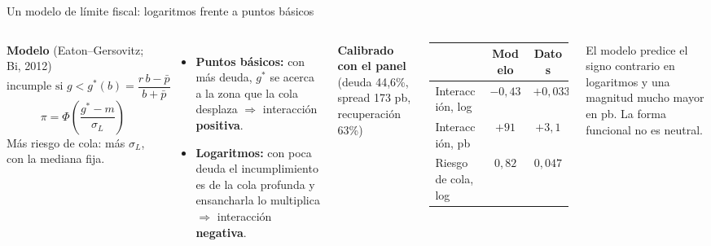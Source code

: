 \documentclass[aspectratio=169]{beamer}
\begin{document}
\begin{frame}{Un modelo de límite fiscal: logaritmos frente a puntos básicos}
\small
\begin{columns}[T]
\textbf{Modelo} (Eaton--Gersovitz; Bi, 2012)
\[ \text{incumple si } g<g^*(b)=\frac{r\,b-\bar p}{b+\bar p} \]
\[ \pi=\Phi\!\left(\frac{g^*-m}{\sigma_L}\right) \]
Más riesgo de cola: más $\sigma_L$, con la mediana fija.
\begin{itemize}\footnotesize
\item \textbf{Puntos básicos:} con más deuda, $g^*$ se acerca a la zona que la cola desplaza $\Rightarrow$ interacción \textbf{positiva}.
\item \textbf{Logaritmos:} con poca deuda el incumplimiento es de la cola profunda y ensancharla lo multiplica $\Rightarrow$ interacción \textbf{negativa}.
\end{itemize}
\footnotesize
\textbf{Calibrado con el panel} (deuda 44,6\%, spread 173 pb, recuperación 63\%)
\vspace{2pt}

\begin{tabular}{lcc}
\toprule
 & Modelo & Datos \\
\midrule
Interacción, log & $-0{,}43$ & $+0{,}033$ \\
Interacción, pb & $+91$ & $+3{,}1$ \\
Riesgo de cola, log & $0{,}82$ & $0{,}047$ \\
\bottomrule
\end{tabular}
\vspace{4pt}

El modelo predice el signo contrario en logaritmos y una magnitud mucho mayor en pb. La forma funcional no es neutral.
\end{columns}
\end{frame}
\end{document}
